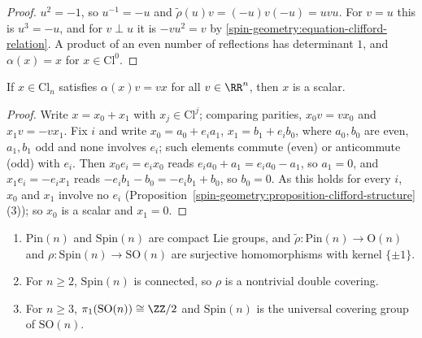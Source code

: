 \begin{proof}
$u^2 = -1$, so $u^{-1} = -u$ and $\tilde{\rho}(u)v = (-u)v(-u) = uvu$. For $v = u$ this is $u^3 = -u$, and for $v \perp u$ it is $-vu^2 = v$ by \eqref{spin-geometry:equation-clifford-relation}. A product of an even
number of reflections has determinant $1$, and $\alpha(x) = x$ for $x \in \mathrm{Cl}^0$.
\end{proof}

\begin{lemma}\label{spin-geometry:lemma-kernel}
If $x \in \mathrm{Cl}_n$ satisfies $\alpha(x)v = vx$ for all $v \in \RR^n$, then $x$ is a scalar.
\end{lemma}

\begin{proof}
Write $x = x_0 + x_1$ with $x_j \in \mathrm{Cl}^j$; comparing parities, $x_0v = vx_0$ and $x_1v = -vx_1$. Fix $i$ and write $x_0 = a_0 + e_ia_1$, $x_1 = b_1 + e_ib_0$, where $a_0, b_0$ are even, $a_1, b_1$ odd and none
involves $e_i$; such elements commute (even) or anticommute (odd) with $e_i$. Then $x_0e_i = e_ix_0$ reads $e_ia_0 + a_1 = e_ia_0 - a_1$, so $a_1 = 0$, and $x_1e_i = -e_ix_1$ reads $-e_ib_1 - b_0 = -e_ib_1 + b_0$, so
$b_0 = 0$. As this holds for every $i$, $x_0$ and $x_1$ involve no $e_i$ (Proposition~\ref{spin-geometry:proposition-clifford-structure}(3)); so $x_0$ is a scalar and $x_1 = 0$.
\end{proof}

\begin{theorem}\label{spin-geometry:theorem-double-cover}
\begin{enumerate}
\item $\mathrm{Pin}(n)$ and $\mathrm{Spin}(n)$ are compact Lie groups, and $\tilde{\rho} \colon \mathrm{Pin}(n) \to \mathrm{O}(n)$ and $\rho \colon \mathrm{Spin}(n) \to \mathrm{SO}(n)$ are surjective homomorphisms with kernel $\{\pm 1\}$.
\item For $n \geq 2$, $\mathrm{Spin}(n)$ is connected, so $\rho$ is a nontrivial double covering.
\item For $n \geq 3$, $\pi_1(\mathrm{SO}(n)) \cong \ZZ/2$ and $\mathrm{Spin}(n)$ is the universal covering group of $\mathrm{SO}(n)$.
\end{enumerate}
\end{theorem}


